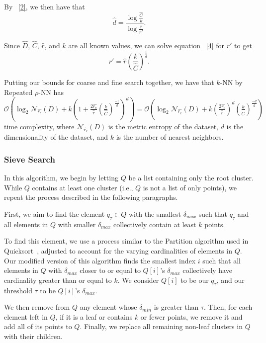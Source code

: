 By ~\ref{2}, we then have that \begin{equation} \hat{d} = \frac{\log{}\frac{\hat{C}}{k}}{\log{}\frac{\hat{r}}{r'}}. \label{5} \end{equation}

Since $\hat{D}$, $\hat{C}$, $\hat{r}$, and $k$ are all known values, we can solve equation ~\ref{4} for $r'$ to get
\begin{equation} r' = \hat{r}\left(\frac{k}{\hat{C}}\right)^{\frac{1}{\hat{d}}}. \label{6} \end{equation}
    
Putting our bounds for coarse and fine search together, we have that $k$-NN by Repeated $\rho$-NN has 
$\mathcal{O}\left(\log_2{\mathcal{N}_{\hat{r_c}}(D)} + k\left(1+ \frac{2\hat{r_c}}{\hat{r}}\left(\frac{k}{\hat{C}}\right)^{\frac{-1}{\hat{d}}}\right)^d\right) = 
\mathcal{O}\left(\log_2{\mathcal{N}_{\hat{r_c}}(D)} + k\left(\frac{2\hat{r_c}}{\hat{r}}\right)^d\left(\frac{k}{\hat{C}}\right)^{\frac{-d}{\hat{d}}}\right)$ 
time complexity, where $\mathcal{N}_{\hat{r_c}}(D)$ is the metric entropy of the dataset, $d$ is the dimensionality of the dataset, and $k$ is the number of nearest neighbors. 

\subsubsection{Sieve Search}
\label{subsubsec:methods:knn-search:sieve}
In this algorithm, we begin by letting $Q$ be a list containing only the root cluster. 
While $Q$ contains at least one cluster (i.e., $Q$ is not a list of only points), we repeat the process described in 
the following paragraphs. 

First, 
we aim to find the element $q_{\tau} \in Q$ with the smallest $\delta_{max}$ such that 
$q_{\tau}$ and all elements in $Q$ with smaller $\delta_{max}$ collectively contain at least $k$ points. 

To find this element, 
we use a process similar to the Partition algorithm used in Quicksort~\cite{10.1093/comjnl/5.1.10}, adjusted to account for the varying cardinalities of elements in $Q$. 
Our modified version of this algorithm finds the smallest index $i$ such 
that all elements in $Q$ with $\delta_{max}$ closer to or equal to $Q[i]$'s $\delta_{max}$ collectively have cardinality greater
than or equal to $k$. We consider $Q[i]$ to be our $q_{\tau}$, and our threshold 
$\tau$ to be $Q[i]$'s $\delta_{max}$.

We then remove from $Q$ any element whose $\delta_{min}$ is greater than $\tau$. Then, for each element left 
in $Q$, if it is a leaf or contains $k$ or fewer points, we remove it and add all of its points to $Q$. Finally, we
replace all remaining non-leaf clusters in $Q$ with their children. 

